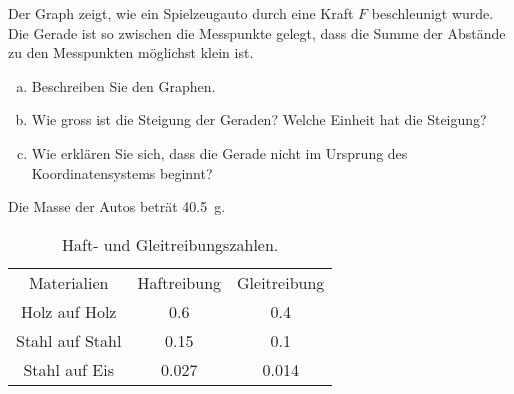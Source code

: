 \documentclass[12pt,a4paper,twoside]{article}
\def\dir{./Aufgaben_Mechanik/}
\newcommand{\Einbinden}[1]{}
\begin{document}
\begin{center}

\end{center}

\begin{aufgabe}
Der Graph zeigt, wie ein Spielzeugauto durch eine Kraft $F$ beschleunigt wurde.
Die Gerade ist so zwischen die Messpunkte gelegt, dass die Summe der Abstände zu den Messpunkten möglichst klein ist.

\begin{enumerate} [a)]
	\item Beschreiben Sie den Graphen.
	\item Wie gross ist die Steigung der Geraden? Welche Einheit hat die Steigung?
	\item Wie erklären Sie sich, dass die Gerade nicht im Ursprung des Koordinatensystems beginnt?
\end{enumerate}
Die Masse der Autos beträt \SI{40.5}{g}.

\end{aufgabe}

\Einbinden{\dir/dynamik02.tex}
\Einbinden{\dir/newton02.tex}
\Einbinden{\dir/newton03.tex}

\newpage

\begin{table}
	\centering
	\begin{tabular}{ccc}
		Materialien  & Haftreibung  & Gleitreibung \\
		Holz auf Holz   &  \num{0.6}  & \num{0.4} \\
		Stahl auf Stahl &  \num{0.15} & \num{0.1}\\
		Stahl auf Eis   &  \num{0.027}& \num{0.014}\\
	\end{tabular}
	\caption{Haft- und Gleitreibungszahlen.}
	\label{tab:reibung}
\end{table}
\end{document}

